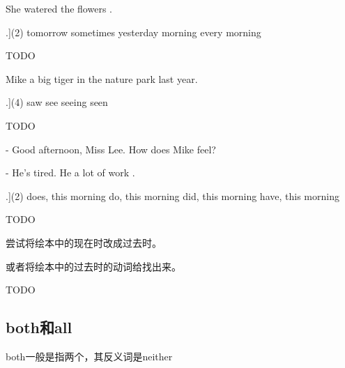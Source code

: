 \documentclass[a4paper]{article}
\begin{document}
\begin{question}
 She watered the flowers \blank[width=1cm]{}.

   \begin{tasks}[counter-format=tsk[A].](2)
              \task tomorrow
              \task sometimes
              \task yesterday morning
              \task every morning
   \end{tasks}

\end{question}
\begin{solution}
TODO
\end{solution}

\begin{question}
 Mike \blank[width=1cm]{} a big tiger in the nature park last year.

   \begin{tasks}[counter-format=tsk[A].](4)
              \task saw
              \task see
              \task seeing
              \task seen
   \end{tasks}

\end{question}
\begin{solution}
TODO
\end{solution}

\begin{question}
- Good afternoon, Miss Lee. How does Mike feel?

- He's tired. He \blank[width=1cm]{} a lot of work \blank[width=1cm]{}.

   \begin{tasks}[counter-format=tsk[A].](2)
              \task does, this morning
              \task do, this morning
              \task did, this morning
              \task have, this morning
   \end{tasks}

\end{question}
\begin{solution}
TODO
\end{solution}

\begin{question}
 尝试将绘本中的现在时改成过去时。

 或者将绘本中的过去时的动词给找出来。
\end{question}
\begin{solution}
TODO
\end{solution}

  \subsection{both和all}
both一般是指两个，其反义词是neither
\end{document}
